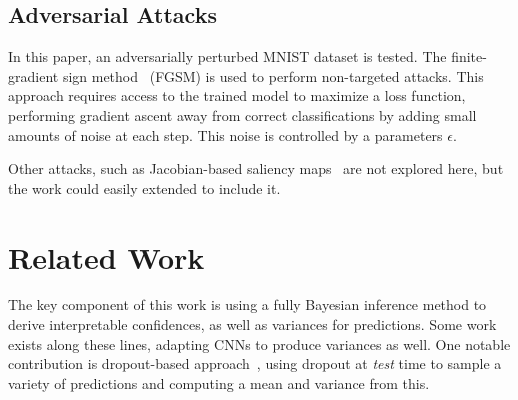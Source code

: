\documentclass{article}
\begin{document}
\subsection{Adversarial Attacks}
\label{sec:background:adv}
% 
In this paper, an adversarially perturbed MNIST dataset is tested. The finite-gradient sign method~\cite{goodfellow2014explaining} (FGSM) is used to perform non-targeted attacks. This approach requires access to the trained model to maximize a loss function, performing gradient ascent away from correct classifications by adding small amounts of noise at each step. This noise is controlled by a parameters $\epsilon$.

Other attacks, such as Jacobian-based saliency maps~\cite{papernot2016limitations} are not explored here, but the work could easily extended to include it.


  
 



\section{Related Work}


The key component of this work is using a fully Bayesian inference method to derive interpretable confidences, as well as variances for predictions. Some work exists along these lines, adapting CNNs to produce variances as well. One notable contribution is dropout-based approach~\cite{gal2016dropout}, using dropout at \textit{test} time to sample a variety of predictions and computing a mean and variance from this.
\end{document}
